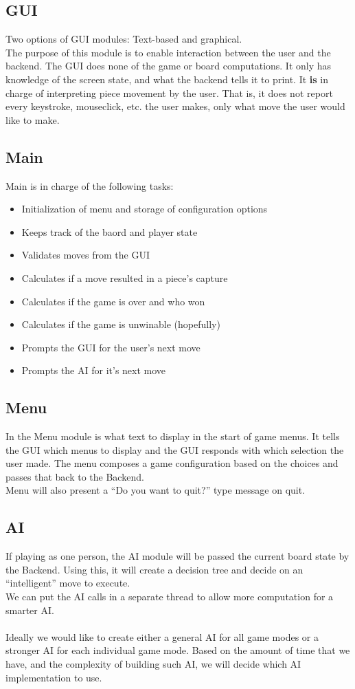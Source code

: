 \documentclass[11pt, oneside]{article}
\begin{document}
\begin{enumerate}
\subsection{GUI}
Two options of GUI modules: Text-based and graphical.\\
The purpose of this module is to enable interaction between the user and the
backend. The GUI does none of the game or board computations. It only has
knowledge of the screen state, and what the backend tells it to print. It
\textbf{is} in charge of interpreting piece movement by the user. That is, it
does not report every keystroke, mouseclick, etc. the user makes, only what move
the user would like to make.

\subsection{Main}
Main is in charge of the following tasks:
\begin{itemize}
\item Initialization of menu and storage of configuration options
\item Keeps track of the baord and player state
\item Validates moves from the GUI
\item Calculates if a move resulted in a piece's capture
\item Calculates if the game is over and who won
\item Calculates if the game is unwinable (hopefully)
\item Prompts the GUI for the user's next move
\item Prompts the AI for it's next move
\end{itemize}

\subsection{Menu}
In the Menu module is what text to display in the start of game menus. It tells
the GUI which menus to display and the GUI responds with which selection the
user made. The menu composes a game configuration based on the choices and
passes that back to the Backend.\\
Menu will also present a ``Do you want to quit?'' type message on quit.

\subsection{AI}
If playing as one person, the AI module will be passed the current board state
by the Backend. Using this, it will create a decision tree and decide on an
``intelligent'' move
to execute.\\
We can put the AI calls in a separate thread to allow more computation for a
smarter AI.\\\\
Ideally we would like to create either a general AI for all game modes or a
stronger AI for each individual game mode. Based on the amount of time that we
have, and the complexity of building such AI, we will decide which AI
implementation to use.


\end{enumerate}
\end{document}
